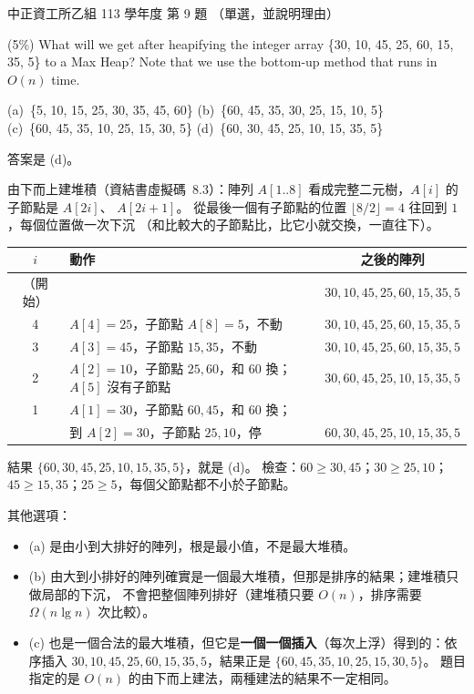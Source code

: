 \begin{pastexam}[label={px:ccu-113-csb-05}]{中正資工所乙組 113 學年度 第 9 題}
（單選，並說明理由）

(5\%) What will we get after heapifying the integer array \{30, 10, 45, 25, 60, 15, 35, 5\} to a Max
Heap? Note that we use the bottom-up method that runs in $O(n)$ time.

(a)~\{5, 10, 15, 25, 30, 35, 45, 60\} \qquad (b)~\{60, 45, 35, 30, 25, 15, 10, 5\}\\
(c)~\{60, 45, 35, 10, 25, 15, 30, 5\} \qquad (d)~\{60, 30, 45, 25, 10, 15, 35, 5\}
\end{pastexam}

\begin{pastsoln}
答案是 (d)。

由下而上建堆積（資結書虛擬碼~8.3）：陣列 $A[1..8]$ 看成完整二元樹，$A[i]$ 的子節點是 $A[2i]$、
$A[2i+1]$。 從最後一個有子節點的位置 $\lfloor 8/2 \rfloor = 4$ 往回到 $1$，每個位置做一次下沉
（和比較大的子節點比，比它小就交換，一直往下）。
\begin{center}
\small
\begin{tabular}{clc}
\toprule
$i$ & 動作 & 之後的陣列 \\
\midrule
（開始） & & $30, 10, 45, 25, 60, 15, 35, 5$ \\
4 & $A[4] = 25$，子節點 $A[8] = 5$，不動 & $30, 10, 45, 25, 60, 15, 35, 5$ \\
3 & $A[3] = 45$，子節點 $15, 35$，不動 & $30, 10, 45, 25, 60, 15, 35, 5$ \\
2 & $A[2] = 10$，子節點 $25, 60$，和 $60$ 換；$A[5]$ 沒有子節點 & $30, 60, 45, 25, 10, 15, 35, 5$ \\
1 & $A[1] = 30$，子節點 $60, 45$，和 $60$ 換； & \\
  & 到 $A[2] = 30$，子節點 $25, 10$，停 & $60, 30, 45, 25, 10, 15, 35, 5$ \\
\bottomrule
\end{tabular}
\end{center}
結果 $\{60, 30, 45, 25, 10, 15, 35, 5\}$，就是 (d)。 檢查：$60 \ge 30, 45$；$30 \ge 25, 10$；
$45 \ge 15, 35$；$25 \ge 5$，每個父節點都不小於子節點。

其他選項：
\begin{itemize}
\item (a) 是由小到大排好的陣列，根是最小值，不是最大堆積。
\item (b) 由大到小排好的陣列確實是一個最大堆積，但那是排序的結果；建堆積只做局部的下沉，
不會把整個陣列排好（建堆積只要 $O(n)$，排序需要 $\Omega(n \lg n)$ 次比較）。
\item (c) 也是一個合法的最大堆積，但它是\textbf{一個一個插入}（每次上浮）得到的：依序插入
$30, 10, 45, 25, 60, 15, 35, 5$，結果正是 $\{60, 45, 35, 10, 25, 15, 30, 5\}$。 題目指定的是
$O(n)$ 的由下而上建法，兩種建法的結果不一定相同。
\end{itemize}
\end{pastsoln}
